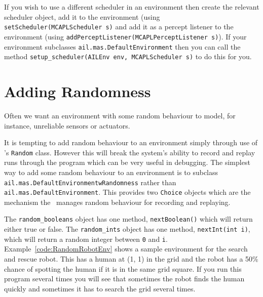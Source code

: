 \begin{sloppypar}
If you wish to use a different scheduler in an environment then create the relevant scheduler object, add it to the environment (using \texttt{setScheduler(MCAPLScheduler s)} and add it as a percept listener to the environment (using \texttt{addPerceptListener(MCAPLPerceptListener s)}).  If your environment subclasses \texttt{ail.mas.DefaultEnvironment} then you can call the method \texttt{setup\_scheduler(AILEnv env, MCAPLScheduler s)} to do this for you.
\end{sloppypar}

\section{Adding Randomness}

Often we want an environment with some random behaviour to model, for instance, unreliable sensors or actuators.

\begin{sloppypar}
It is tempting to add random behaviour to an environment simply through use of \java's \texttt{Random} class.  However this will break the system's ability to record and replay runs through the program which can be very useful in debugging.  The simplest way to add some random behaviour to an environment is to subclass \texttt{ail.mas.DefaultEnvironmentwRandomness} rather than \texttt{ail.mas.DefaultEnvironment}.  This provides two \texttt{Choice} objects which are the mechanism the \ail\ manages random behaviour for recording and replaying.
\end{sloppypar}

The \texttt{random\_booleans} object has one method, \texttt{nextBoolean()} which will return either true or false.  The \texttt{random\_ints} object has one method, \texttt{nextInt(int i)}, which will return a random integer between \texttt{0} and \texttt{i}.  Example~\ref{code:RandomRobotEnv} shows a sample environment for the search and rescue robot.  This has a human at (1, 1) in the grid and the robot has a 50\% chance of spotting the human if it is in the same grid square.   If you run this program several times you will see that sometimes the robot finds the human quickly and sometimes it has to search the grid several times.

